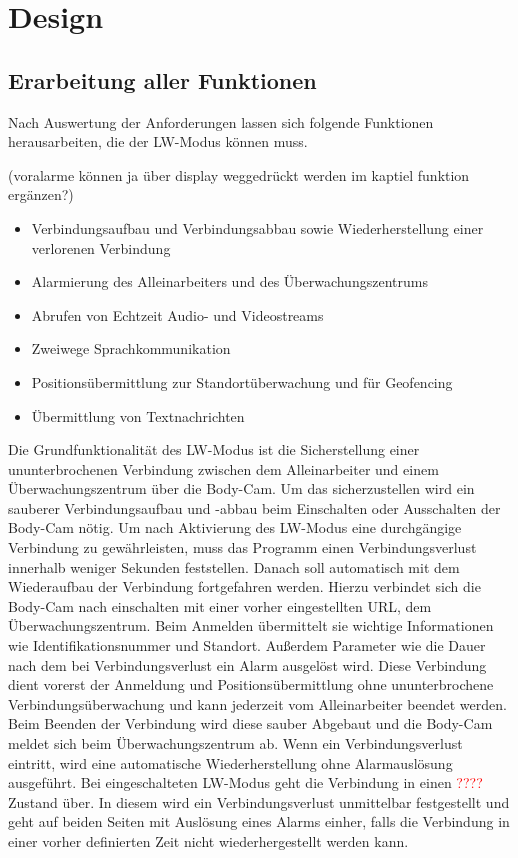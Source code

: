 \documentclass[thesis.tex]{subfiles}
\begin{document}
\chapter{Design}\label{chap:design}

\section{Erarbeitung aller Funktionen}
Nach Auswertung der Anforderungen lassen sich folgende Funktionen herausarbeiten, die der LW-Modus können muss.

(voralarme können ja über display weggedrückt werden im kaptiel funktion ergänzen?)

\begin{itemize}
    \item Verbindungsaufbau und Verbindungsabbau sowie Wiederherstellung einer verlorenen Verbindung
    \item Alarmierung des Alleinarbeiters und des Überwachungszentrums
    \item Abrufen von Echtzeit Audio- und Videostreams
    \item Zweiwege Sprachkommunikation
    \item Positionsübermittlung zur Standortüberwachung und für Geofencing
    \item Übermittlung von Textnachrichten
\end{itemize}

Die Grundfunktionalität des LW-Modus ist die Sicherstellung einer ununterbrochenen Verbindung zwischen dem Alleinarbeiter und einem Überwachungszentrum über die Body-Cam.
Um das sicherzustellen wird ein sauberer Verbindungsaufbau und -abbau beim Einschalten oder Ausschalten der Body-Cam nötig.
Um nach Aktivierung des LW-Modus eine durchgängige Verbindung zu gewährleisten, muss das Programm einen Verbindungsverlust innerhalb weniger Sekunden feststellen.
Danach soll automatisch mit dem Wiederaufbau der Verbindung fortgefahren werden.
Hierzu verbindet sich die Body-Cam nach einschalten mit einer vorher eingestellten URL, dem Überwachungszentrum.
Beim Anmelden übermittelt sie wichtige Informationen wie Identifikationsnummer und Standort.
Außerdem Parameter wie die Dauer nach dem bei Verbindungsverlust ein Alarm ausgelöst wird.
Diese Verbindung dient vorerst der Anmeldung und Positionsübermittlung ohne ununterbrochene Verbindungsüberwachung und kann jederzeit vom Alleinarbeiter beendet werden.
Beim Beenden der Verbindung wird diese sauber Abgebaut und die Body-Cam meldet sich beim Überwachungszentrum ab.
Wenn ein Verbindungsverlust eintritt, wird eine automatische Wiederherstellung ohne Alarmauslösung ausgeführt.
Bei eingeschalteten LW-Modus geht die Verbindung in einen \textcolor{red}{????} Zustand über.
In diesem wird ein Verbindungsverlust unmittelbar festgestellt und geht auf beiden Seiten mit Auslösung eines Alarms einher, falls die Verbindung in einer vorher definierten Zeit nicht wiederhergestellt werden kann.
\\
\end{document}
